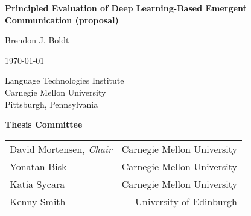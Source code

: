 \thispagestyle{title}
\begin{centering}
\textbf{\LARGE Principled Evaluation of Deep Learning-Based Emergent Communication (proposal)}

\vspace{3pc}
{\large Brendon J. Boldt}

\vspace{2pc}
\today{}

\vfill

Language Technologies Institute \\
Carnegie Mellon University \\
Pittsburgh, Pennsylvania

\vspace{4pc}

\textbf{Thesis Committee}
\vspace{0.5pc}

\begin{tabular}{lr}
  David Mortensen, \emph{Chair} & Carnegie Mellon University \\
  Yonatan Bisk & Carnegie Mellon University \\
  Katia Sycara & Carnegie Mellon University \\
  Kenny Smith & University of Edinburgh
\end{tabular}

\end{centering}
